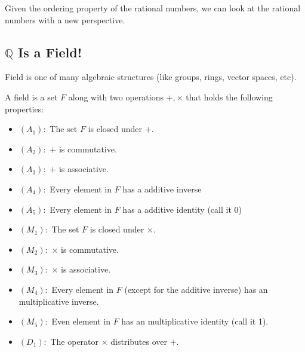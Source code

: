 Given the ordering property of the rational numbers, we can look at the rational numbers with a new perspective.


\subsection{$ \mathbb{Q} $ Is a Field!}
Field is one of many algebraic structures (like groups, rings, vector spaces, etc). 

\begin{defbox}[Field]
	A field is a set $ F $ along with two operations $ +, \times $ that holds the following properties:
	\begin{itemize}
		\item $ (A_1): $ The set $ F $ is closed under $ + $. 
		\item $ (A_2): $ $ + $ is commutative.
		\item $ (A_3): $ $ + $ is associative.
		\item $ (A_4): $ Every element in $ F $ has a additive inverse
		\item $ (A_5): $ Every element in $ F $ has a additive identity (call it 0)
		\item $ (M_1): $ The set $ F $ is closed under $ \times $.
		\item $ (M_2): $ $ \times $ is commutative.
		\item $ (M_3): $ $ \times $ is associative.
		\item $ (M_4): $ Every element in $ F $ (except for the additive inverse) has an multiplicative inverse.
		\item $ (M_5): $ Even element in $ F $ has an multiplicative identity (call it 1).
		\item $ (D_1): $ The operator $ \times $ distributes over $ + $.
	\end{itemize}
\end{defbox}


